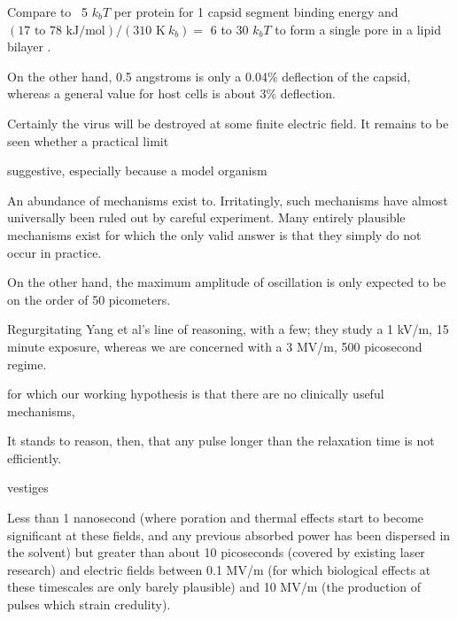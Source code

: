 \documentclass[paper.tex]{subfiles}
\begin{document}
\begin{multicols}{1}
Compare to ~5 $k_b T$ per protein for 1 capsid segment binding energy \cite{Energies2012} \cite{Weak2002} and $ (\text{17 to 78 kJ/mol})  / (310 \text{ K}\ k_b) = $ 6 to 30 $k_b T$ to form a single pore in a lipid bilayer \cite{Atomistic2014a}.

On the other hand, 0.5 angstroms is only a 0.04\% deflection of the capsid, whereas a general value for host cells is about 3\% deflection. 

Certainly the virus will be destroyed at some finite electric field. It remains to be seen whether a practical limit 

 \cite{Resonance1996}






suggestive, especially because a model organism

An abundance of mechanisms exist to. Irritatingly, such mechanisms have almost universally been ruled out by careful experiment. Many entirely plausible mechanisms exist for which the only valid answer is that they simply do not occur in practice.


On the other hand, the maximum amplitude of oscillation is only expected to be on the order of 50 picometers. 


Regurgitating Yang et al's line of reasoning, with a few; they study a 1 kV/m, 15 minute exposure, whereas we are concerned with a 3 MV/m, 500 picosecond regime. 


for which our working hypothesis is that there are no clinically useful mechanisms, 



It stands to reason, then, that any pulse longer than the relaxation time is not efficiently. 

vestiges

Less than 1 nanosecond (where poration and thermal effects start to become significant at these fields, and any previous absorbed power has been dispersed in the solvent) but greater than about 10 picoseconds (covered by existing laser research) and electric fields between 0.1 MV/m (for which biological effects at these timescales are only barely plausible) and 10 MV/m (the production of pulses which strain credulity).


\end{multicols}
\end{document}

